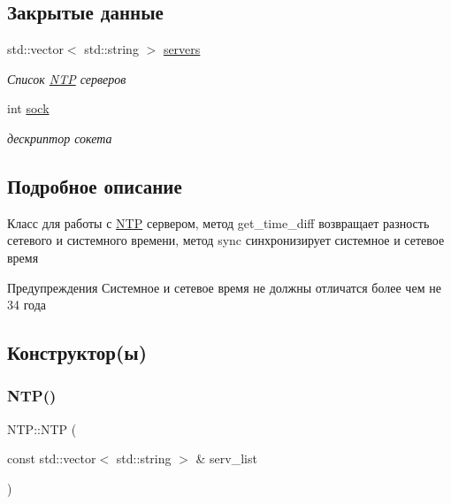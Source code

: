 \subsection*{Закрытые данные}
\begin{DoxyCompactItemize}
\item 
\mbox{\label{classNTP_a2425b4fddbc7f0f1f8ce4f9903b3f9d4}} 
std\+::vector$<$ std\+::string $>$ \mbox{\hyperlink{classNTP_a2425b4fddbc7f0f1f8ce4f9903b3f9d4}{servers}}
\begin{DoxyCompactList}\small\item\em Список \mbox{\hyperlink{classNTP}{N\+TP}} серверов \end{DoxyCompactList}\item 
\mbox{\label{classNTP_ac85e51c850532aef16228baf21819492}} 
int \mbox{\hyperlink{classNTP_ac85e51c850532aef16228baf21819492}{sock}}
\begin{DoxyCompactList}\small\item\em дескриптор сокета \end{DoxyCompactList}\end{DoxyCompactItemize}


\subsection{Подробное описание}
Класс для работы с \mbox{\hyperlink{classNTP}{N\+TP}} сервером, метод get\+\_\+time\+\_\+diff возвращает разность сетевого и системного времени, метод sync синхронизирует системное и сетевое время 

\begin{DoxyWarning}{Предупреждения}
Системное и сетевое время не должны отличатся более чем не 34 года 
\end{DoxyWarning}


\subsection{Конструктор(ы)}
\mbox{\label{classNTP_ad652f28e14fe994f0389985c56f069ed}} 
\subsubsection{\texorpdfstring{NTP()}{NTP()}}
{\footnotesize\ttfamily N\+T\+P\+::\+N\+TP (\begin{DoxyParamCaption}\item[{const std\+::vector$<$ std\+::string $>$ \&}]{serv\+\_\+list }\end{DoxyParamCaption})}



